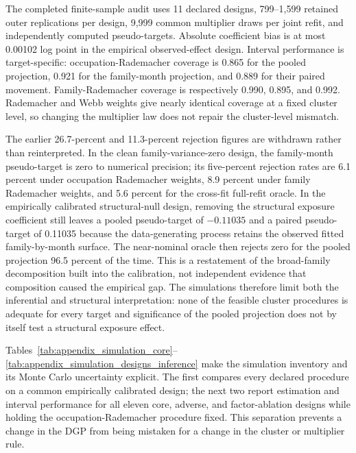 The completed finite-sample audit uses 11 declared designs, 799--1,599 retained outer replications per design, 9,999 common multiplier draws per joint refit, and independently computed pseudo-targets.  Absolute coefficient bias is at most 0.00102 log point in the empirical observed-effect design.  Interval performance is target-specific: occupation-Rademacher coverage is 0.865 for the pooled projection, 0.921 for the family-month projection, and 0.889 for their paired movement.  Family-Rademacher coverage is respectively 0.990, 0.895, and 0.992.  Rademacher and Webb weights give nearly identical coverage at a fixed cluster level, so changing the multiplier law does not repair the cluster-level mismatch.

The earlier 26.7-percent and 11.3-percent rejection figures are withdrawn rather than reinterpreted.  In the clean family-variance-zero design, the family-month pseudo-target is zero to numerical precision; its five-percent rejection rates are 6.1 percent under occupation Rademacher weights, 8.9 percent under family Rademacher weights, and 5.6 percent for the cross-fit full-refit oracle.  In the empirically calibrated structural-null design, removing the structural exposure coefficient still leaves a pooled pseudo-target of $-0.11035$ and a paired pseudo-target of 0.11035 because the data-generating process retains the observed fitted family-by-month surface.  The near-nominal oracle then rejects zero for the pooled projection 96.5 percent of the time.  This is a restatement of the broad-family decomposition built into the calibration, not independent evidence that composition caused the empirical gap.  The simulations therefore limit both the inferential and structural interpretation: none of the feasible cluster procedures is adequate for every target and significance of the pooled projection does not by itself test a structural exposure effect.

Tables~\ref{tab:appendix_simulation_core}--
\ref{tab:appendix_simulation_designs_inference} make the simulation inventory
and its Monte Carlo uncertainty explicit.  The first compares every declared
procedure on a common empirically calibrated design; the next two report
estimation and interval performance for all eleven core, adverse, and
factor-ablation designs while holding the occupation-Rademacher procedure
fixed.  This separation prevents a change in the DGP from being mistaken for
a change in the cluster or multiplier rule.





